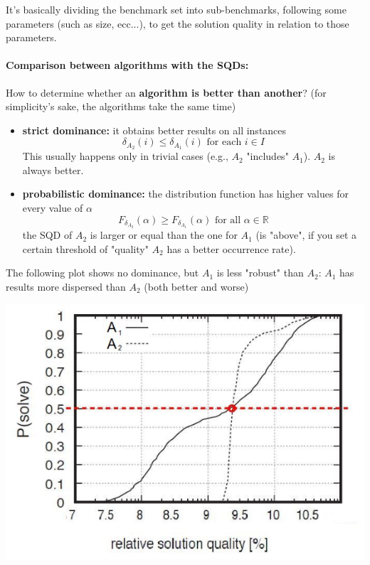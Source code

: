 \documentclass[11pt]{article}
\begin{document}
	It's basically dividing the benchmark set into sub-benchmarks, following some parameters (such as size, ecc...), to get the solution quality in relation to those parameters. \\
	
	\newpage
	
	\paragraph{Comparison between algorithms with the SQDs:} How to determine whether an \textbf{algorithm is better than another}? (for simplicity's sake, the algorithms take the same time)
	\begin{itemize}
		\item \textbf{strict dominance:} it obtains better results on all instances
		$$ \delta_{A_2} (i) \leq \delta_{A_1} (i) \text{ for each } i \in I $$
		This usually happens only in trivial cases (e.g., $A_2$ "includes" $A_1$). $A_2$ is always better. \\
		
		\item \textbf{probabilistic dominance:} the distribution function has higher values for every value of $\alpha$
		$$ F_{\delta_{A_2}} (\alpha) \geq F_{\delta_{A_1}} (\alpha) \text{ for all } \alpha \in \mathbb{R} $$
		the SQD of $A_2$ is larger or equal than the one for $A_1$ (is "above", if you set a certain threshold of "quality" $A_2$ has a better occurrence rate).\\
	\end{itemize}
	
	The following plot shows no dominance, but $A_1$ is less "robust" than $A_2$: $A_1$ has results more dispersed than $A_2$ (both better and worse)
	\begin{center}
		\includegraphics[width=0.7\columnwidth]{img/SQD4}
	\end{center}
	
\end{document}
